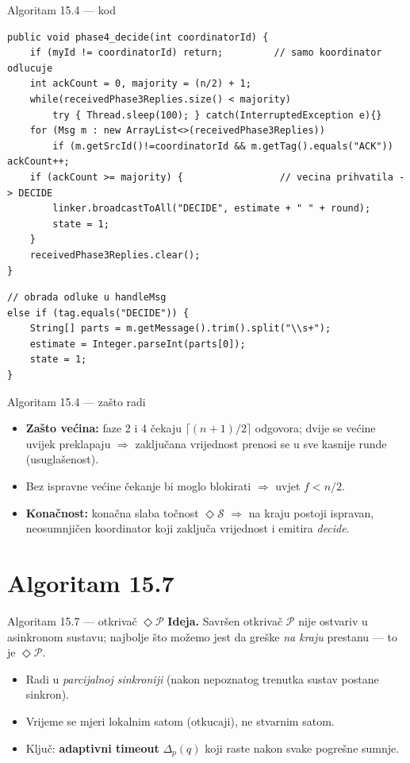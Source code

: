\documentclass[aspectratio=169,11pt]{beamer}
\newcommand{\Dp}{\ensuremath{\mathcal{P}}}
\newcommand{\eP}{\ensuremath{\Diamond\mathcal{P}}}
\newcommand{\eS}{\ensuremath{\Diamond\mathcal{S}}}
\begin{document}
\begin{frame}{Algoritam 15.4 --- kod}
\begin{lstlisting}
public void phase4_decide(int coordinatorId) {
    if (myId != coordinatorId) return;         // samo koordinator odlucuje
    int ackCount = 0, majority = (n/2) + 1;
    while(receivedPhase3Replies.size() < majority)
        try { Thread.sleep(100); } catch(InterruptedException e){}
    for (Msg m : new ArrayList<>(receivedPhase3Replies))
        if (m.getSrcId()!=coordinatorId && m.getTag().equals("ACK")) ackCount++;
    if (ackCount >= majority) {                 // vecina prihvatila -> DECIDE
        linker.broadcastToAll("DECIDE", estimate + " " + round);
        state = 1;
    }
    receivedPhase3Replies.clear();
}
\end{lstlisting}

\begin{lstlisting}
// obrada odluke u handleMsg
else if (tag.equals("DECIDE")) {
    String[] parts = m.getMessage().trim().split("\\s+");
    estimate = Integer.parseInt(parts[0]);
    state = 1;
}
\end{lstlisting}
\end{frame}

\begin{frame}{Algoritam 15.4 --- zašto radi}
  \begin{itemize}
    \item \textbf{Zašto većina:} faze 2 i 4 čekaju $\lceil(n{+}1)/2\rceil$
      odgovora; dvije se većine uvijek preklapaju $\Rightarrow$ zaključana
      vrijednost prenosi se u sve kasnije runde (usuglašenost).
    \item Bez ispravne većine čekanje bi moglo blokirati $\Rightarrow$ uvjet
      $f<n/2$.
    \item \textbf{Konačnost:} konačna slaba točnost \eS{} $\Rightarrow$ na kraju
      postoji ispravan, neosumnjičen koordinator koji zaključa vrijednost i
      emitira \textit{decide}.
  \end{itemize}
\end{frame}


\section{Algoritam 15.7}

\begin{frame}{Algoritam 15.7 --- otkrivač \eP}
  \textbf{Ideja.} Savršen otkrivač \Dp{} nije ostvariv u asinkronom sustavu;
  najbolje što možemo jest da greške \emph{na kraju} prestanu --- to je \eP.
  \begin{itemize}
    \item Radi u \emph{parcijalnoj sinkroniji} (nakon nepoznatog trenutka sustav
      postane sinkron).
    \item Vrijeme se mjeri lokalnim satom (otkucaji), ne stvarnim satom.
    \item Ključ: \textbf{adaptivni timeout} $\Delta_p(q)$ koji raste nakon svake
      pogrešne sumnje.
  \end{itemize}
\end{frame}
\end{document}
